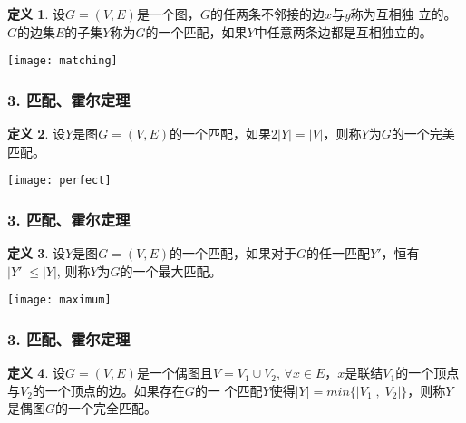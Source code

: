 \documentclass{beamer}
\theoremstyle{definition}
\newtheorem{Def}{定义}[section]
\theoremstyle{example}
\begin{document}
\begin{CJK}{UTF8}{gbsn}
\begin{frame}
  \begin{Def}
    设$G=(V,E)$是一个图，$G$的任两条不邻接的边$x$与$y$称为互相\alert{独
      立}的。$G$的边集$E$的子集$Y$称为$G$的一个\alert{匹配}，如果$Y$中任意两条边都是互相独立的。
  \end{Def}
\pause
\centering
\texttt{[image: matching]}
\end{frame}
\begin{frame}
  \frametitle{3. 匹配、霍尔定理}
  \begin{Def}
    设$Y$是图$G=(V,E)$的一个匹配，如果$2|Y|=|V|$，则称$Y$为$G$的一个\alert{完美匹配}。
  \end{Def}
\pause
\centering
\texttt{[image: perfect]}
\end{frame}

\begin{frame}
  \frametitle{3. 匹配、霍尔定理}

    \begin{Def}
   设$Y$是图$G=(V,E)$的一个匹配，如果对于$G$的任一匹配$Y'$，恒有$|Y'|\leq |Y|$, 则称$Y$为$G$的一个\alert{最大匹配}。
  \end{Def}
\pause
\centering
\texttt{[image: maximum]}

\end{frame}
\begin{frame}
  \frametitle{3. 匹配、霍尔定理}

  \begin{Def}
    设$G=(V,E)$是一个偶图且$V=V_1\cup V_2$,
    $\forall x \in
    E$，$x$是联结$V_1$的一个顶点与$V_2$的一个顶点的边。如果存在$G$的一
    个匹配$Y$使得$|Y|=min\{|V_1|,|V_2|\}$，则称$Y$是偶图$G$的一个\alert{完全匹配}。
  \end{Def}

\end{frame}
\end{CJK}
\end{document}

